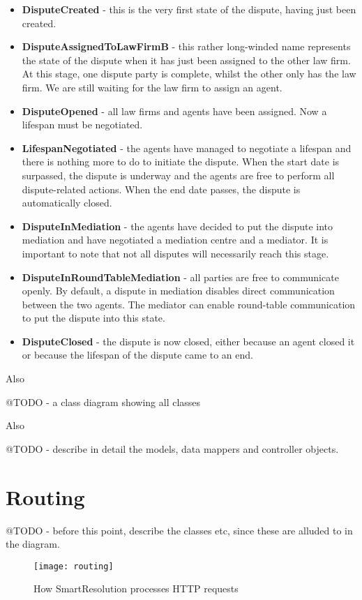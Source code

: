 \begin{itemize}
    \item \textbf{DisputeCreated} - this is the very first state of the dispute, having just been created.
    \item \textbf{DisputeAssignedToLawFirmB} - this rather long-winded name represents the state of the dispute when it has just been assigned to the other law firm. At this stage, one dispute party is complete, whilst the other only has the law firm. We are still waiting for the law firm to assign an agent.
    \item \textbf{DisputeOpened} - all law firms and agents have been assigned. Now a lifespan must be negotiated.
    \item \textbf{LifespanNegotiated} - the agents have managed to negotiate a lifespan and there is nothing more to do to initiate the dispute. When the start date is surpassed, the dispute is underway and the agents are free to perform all dispute-related actions. When the end date passes, the dispute is automatically closed.
    \item \textbf{DisputeInMediation} - the agents have decided to put the dispute into mediation and have negotiated a mediation centre and a mediator. It is important to note that not all disputes will necessarily reach this stage.
    \item \textbf{DisputeInRoundTableMediation} - all parties are free to communicate openly. By default, a dispute in mediation disables direct communication between the two agents. The mediator can enable round-table communication to put the dispute into this state.
    \item \textbf{DisputeClosed} - the dispute is now closed, either because an agent closed it or because the lifespan of the dispute came to an end.
\end{itemize}


Also

@TODO - a class diagram showing all classes

Also

@TODO - describe in detail the models, data mappers and controller objects.

\section{Routing}

@TODO - before this point, describe the classes etc, since these are alluded to in the diagram.

\begin{figure}[h!]
  \centering
    \ifimages
    \texttt{[image: routing]}
    \fi
  \caption{How SmartResolution processes HTTP requests}
  \label{uml:routing}
\end{figure}

